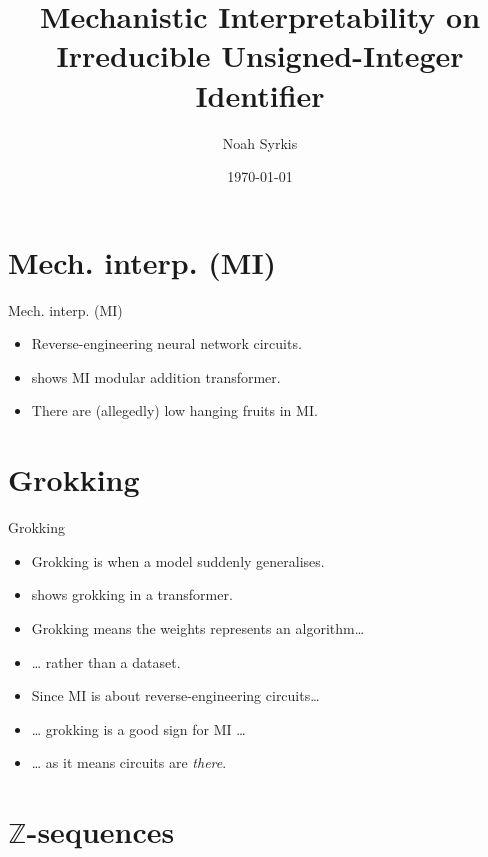 \documentclass[aspectratio=32]{beamer}
\title{Mechanistic Interpretability on Irreducible Unsigned-Integer
Identifier}
\date{\mydate\today}
\author{Noah Syrkis}
\providecommand{\tightlist}{\setlength{\itemsep}{0pt}\setlength{\parskip}{0pt}}
\begin{document}
  \begin{frame}[allowframebreaks]
    \titlepage
  \end{frame}

  \section{\textbar{} Mech. interp. (MI)}\label{mech.-interp.-mi}

  \begin{frame}[allowframebreaks]{\textbar{} Mech. interp. (MI)}
  \begin{itemize}
  \tightlist
  \item
    Reverse-engineering neural network circuits.
  \item
    \textcite{nanda2023} shows MI modular addition transformer.
  \item
    There are (allegedly) low hanging fruits in MI.
  \end{itemize}
  \end{frame}

  \section{\textbar{} Grokking}\label{grokking}

  \begin{frame}[allowframebreaks]{\textbar{} Grokking}
  \begin{itemize}
  \tightlist
  \item
    Grokking is when a model suddenly generalises.
  \item
    \textcite{nanda2023} shows grokking in a transformer.
  \item
    Grokking means the weights represents an algorithm\ldots{}
  \item
    \ldots{} rather than a dataset.
  \end{itemize}

  \framebreak

  \begin{itemize}
  \tightlist
  \item
    Since MI is about reverse-engineering circuits\ldots{}
  \item
    \ldots{} grokking is a good sign for MI \ldots{}
  \item
    \ldots{} as it means circuits are \emph{there}.
  \end{itemize}
  \end{frame}

  \section{\texorpdfstring{\textbar{} \(\mathbb{Z}\)-sequences}{\textbar{} \textbackslash mathbb\{Z\}-sequences}}\label{mathbbz-sequences}
\end{document}
